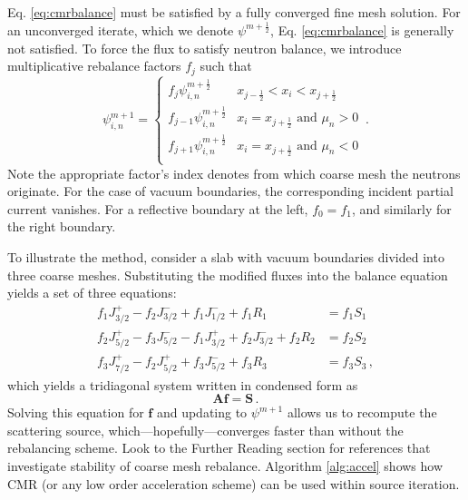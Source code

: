 Eq. \ref{eq:cmrbalance} must be satisfied by a fully converged fine mesh solution.  For an unconverged iterate, which we denote $\psi^{m+\frac{1}{2}}$, Eq. \ref{eq:cmrbalance} is generally not satisfied.  To force the flux to satisfy neutron balance, we introduce multiplicative rebalance factors $f_j$ such that
\begin{equation}
 \psi^{m+1}_{i,n} =
 \begin{cases} f_j \psi^{m+\frac{1}{2}}_{i,n}     &   x_{j-\frac{1}{2}} < x_{i} < x_{j+\frac{1}{2}} \\
               f_{j-1} \psi^{m+\frac{1}{2}}_{i,n} &   x_{i} = x_{j+\frac{1}{2}} \text{ and } \mu_n > 0 \\
               f_{j+1} \psi^{m+\frac{1}{2}}_{i,n} &   x_{i} = x_{j+\frac{1}{2}} \text{ and } \mu_n < 0 \\
 \end{cases} \, .
 \label{eq:alpha}
\end{equation}
Note the appropriate factor's index denotes from which coarse mesh the neutrons originate. For the case of vacuum boundaries, the corresponding incident partial current vanishes.  For a reflective boundary at the left, $f_0 = f_1$, and similarly for the right boundary.

To illustrate the method, consider a slab with vacuum boundaries divided into three coarse meshes.  Substituting the modified fluxes into the balance equation yields a set of three equations:
\begin{equation}
\begin{split}
  f_1 J^+_{3/2}  - f_2 J^{-}_{3/2}                   + f_1 J^{-}_{1/2} + f_1 R_1 &= f_1 S_1 \\
  f_2 J^+_{5/2}  - f_3 J^{-}_{5/2} - f_1 J^{+}_{3/2} + f_2 J^{-}_{3/2} + f_2 R_2 &= f_2 S_2 \\
  f_3 J^+_{7/2}                    - f_2 J^{+}_{5/2} + f_3 J^{-}_{5/2} + f_3 R_3 &= f_3 S_3 \, ,
\end{split}
\end{equation}
which yields a tridiagonal system written in condensed form as
\begin{equation}
 \mathbf{A} \mathbf{f} = \mathbf{S} \, .
\end{equation}
Solving this equation for $\mathbf{f}$ and updating to $\psi^{m+1}$ allows us to recompute the scattering source, which---hopefully---converges faster than without the rebalancing scheme.  Look to the Further Reading section for references that investigate stability of coarse mesh rebalance.  Algorithm \ref{alg:accel} shows how CMR (or any low order acceleration scheme) can be used within source iteration.

